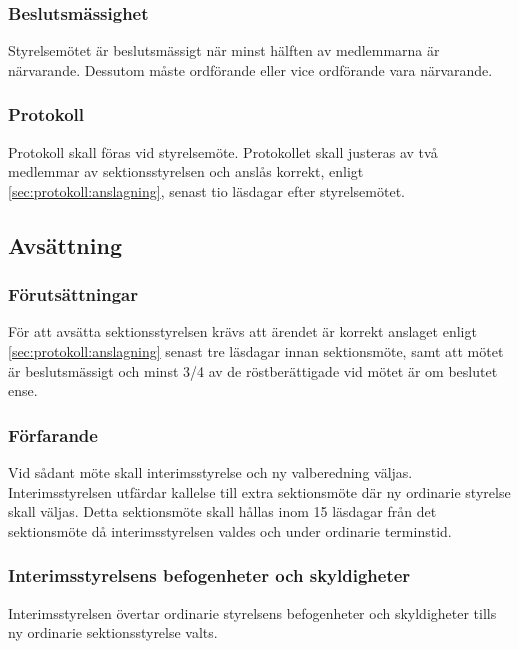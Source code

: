 \subsubsection{Beslutsmässighet}
Styrelsemötet är beslutsmässigt när minst hälften av medlemmarna är närvarande. Dessutom måste ordförande eller vice ordförande vara närvarande.

\subsubsection{Protokoll}
Protokoll skall föras vid styrelsemöte. Protokollet skall justeras av två medlemmar av sektionsstyrelsen och anslås korrekt, enligt \ref{sec:protokoll:anslagning}, senast tio läsdagar efter styrelsemötet.

\subsection{Avsättning}

\subsubsection{Förutsättningar}
För att avsätta sektionsstyrelsen krävs att ärendet är korrekt anslaget enligt \ref{sec:protokoll:anslagning} senast tre läsdagar innan sektionsmöte, samt att mötet är beslutsmässigt och minst 3/4 av de röstberättigade vid mötet är om beslutet ense. 

\subsubsection{Förfarande}
Vid sådant möte skall interimsstyrelse och ny valberedning väljas. Interimsstyrelsen utfärdar kallelse till extra sektionsmöte där ny ordinarie styrelse skall väljas. Detta sektionsmöte skall hållas inom 15 läsdagar från det sektionsmöte då interimsstyrelsen valdes och under ordinarie terminstid.

\subsubsection{Interimsstyrelsens befogenheter och skyldigheter}
Interimsstyrelsen övertar ordinarie styrelsens befogenheter och skyldigheter tills ny ordinarie sektionsstyrelse valts.


